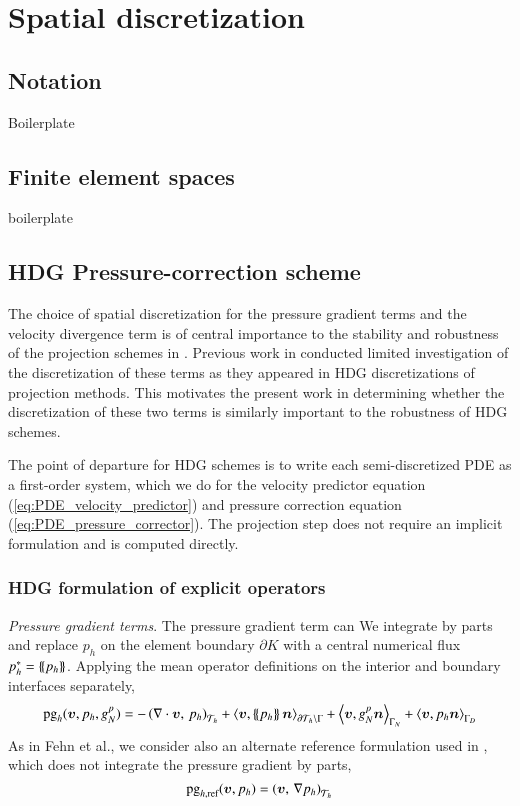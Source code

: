 \section{Spatial discretization}
\subsection{Notation}
Boilerplate

\subsection{Finite element spaces}
boilerplate

\subsection{HDG Pressure-correction scheme}

The choice of spatial discretization for the pressure gradient terms and the velocity divergence term is of central importance to the stability and robustness of the projection schemes in \cite{fehn_robust_2018}.
Previous work in \cite{ueckermann_lermusiaux_JCP2016} conducted limited investigation of the discretization of these terms as they appeared in HDG discretizations of projection methods.
This motivates the present work in determining whether the discretization of these two terms is similarly important to the robustness of HDG schemes. 

The point of departure for HDG schemes is to write each semi-discretized PDE as a first-order system, which we do for the velocity predictor equation (\ref{eq:PDE_velocity_predictor})  and pressure correction equation (\ref{eq:PDE_pressure_corrector}).
The projection step does not require an implicit formulation and is computed directly.

\subsubsection{HDG formulation of explicit operators}

\textit{Pressure gradient terms}. The pressure gradient term can 
We integrate by parts and replace $p_h$ on the element boundary $\partial K$ with a central numerical flux $p^*_h = \left\{\!\left\{p_h\right\}\!\right\} $. Applying the mean operator definitions on the interior and boundary interfaces separately,
\begin{equation}
  \text{pg}_h(\bm{v}, p_h, g_N^p) = -\left(\nabla \cdot \bm{v},\, p_h \right)_{\mathcal{T}_h} 
  + \left\langle \bm{v},\left\{\!\left\{p_h\right\}\!\right\}\bm{n}\right\rangle_{\partial\mathcal{T}_h \setminus \Gamma}
  + \left\langle \bm{v}, g_N^p\bm{n}\right\rangle_{\Gamma_N}
  + \left\langle \bm{v}, p_h\bm{n}\right\rangle_{\Gamma_D}
\end{equation}%
As in Fehn et al., we consider also an alternate reference formulation used in \cite{hesthaven_nodal_2008,ueckermann_lermusiaux_JCP2016}, which does not integrate the pressure gradient by parts,
\begin{equation}
  \text{pg}_{h,\text{ref}}(\bm{v}, p_h) = \left(\bm{v},\, \nabla p_h \right)_{\mathcal{T}_h} 
\end{equation}

